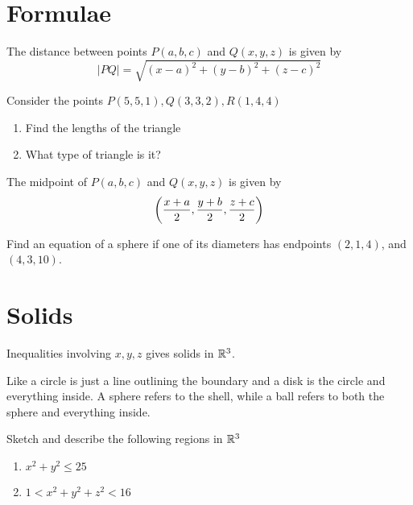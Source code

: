 \documentclass[twoside]{report}
\begin{document}
    \section{Formulae}
    \begin{definition}
        The distance between points $P(a, b, c)$ and $Q(x, y, z)$ is given by
        \begin{equation}
            |PQ| = \sqrt{(x - a)^{2} + (y - b)^{2} + (z - c)^{2}}
        \end{equation}
    \end{definition}
    \begin{example}
        Consider the points $P(5,5,1),Q(3,3,2),R(1,4,4)$
        \begin{enumerate}
            \item Find the lengths of the triangle
            \item What type of triangle is it?
        \end{enumerate}
    \end{example}
    \begin{definition}
        The midpoint of $P(a, b, c)$ and $Q(x, y, z)$ is given by
        \begin{equation}
            \bigg(\frac{x + a}{2},\frac{y + b}{2},\frac{z + c}{2}\bigg)
        \end{equation}
    \end{definition}
    \begin{example}
        Find an equation of a sphere if one of its diameters has endpoints $(2,1,4)$, and $(4,3,10)$.
    \end{example}
    \section{Solids}
    \begin{definition}[Solids]
        Inequalities involving $x, y, z$ gives solids in $\mathbb{R}^{3}$.
    \end{definition}
    Like a circle is just a line outlining the boundary and a disk is the circle and everything inside. A sphere refers to the shell, while a ball refers to both the sphere and everything inside.

    \begin{example}
        Sketch and describe the following regions in $\mathbb{R}^{3}$
        \begin{enumerate}
            \item $x^{2} + y^{2} \leq 25$
            \item $1 < x^{2} + y^{2} + z^{2} < 16$
        \end{enumerate}
    \end{example}
    \np
\end{document}
